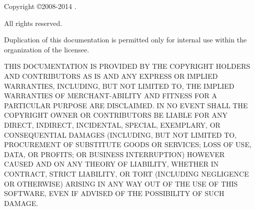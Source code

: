 \clearpage{}

Copyright \copyright 2008-2014 \company.

All rights reserved.

Duplication of this documentation is permitted
only for internal use within the organization of the licensee.

THIS DOCUMENTATION IS PROVIDED BY THE COPYRIGHT
HOLDERS AND CONTRIBUTORS \textquotedbl{}AS IS\textquotedbl{} AND ANY
EXPRESS OR IMPLIED WARRANTIES, INCLUDING, BUT NOT LIMITED TO, THE
IMPLIED WARRANTIES OF MERCHANT-ABILITY AND FITNESS FOR A PARTICULAR
PURPOSE ARE DISCLAIMED. IN NO EVENT SHALL THE COPYRIGHT OWNER OR CONTRIBUTORS
BE LIABLE FOR ANY DIRECT, INDIRECT, INCIDENTAL, SPECIAL, EXEMPLARY,
OR CONSEQUENTIAL DAMAGES (INCLUDING, BUT NOT LIMITED TO, PROCUREMENT
OF SUBSTITUTE GOODS OR SERVICES; LOSS OF USE, DATA, OR PROFITS; OR
BUSINESS INTERRUPTION) HOWEVER CAUSED AND ON ANY THEORY OF LIABILITY,
WHETHER IN CONTRACT, STRICT LIABILITY, OR TORT (INCLUDING NEGLIGENCE
OR OTHERWISE) ARISING IN ANY WAY OUT OF THE USE OF THIS SOFTWARE,
EVEN IF ADVISED OF THE POSSIBILITY OF SUCH DAMAGE.

\vfill{}


